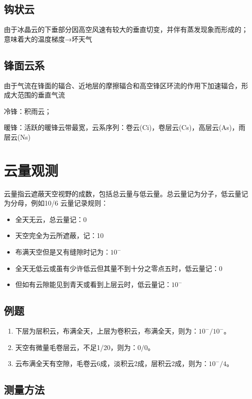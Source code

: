 \documentclass[UTF8,11pt]{ctexbook}
\begin{document}
\subsection{钩状云}

由于冰晶云的下垂部分因高空风速有较大的垂直切变，并伴有蒸发现象而形成的；意味着大的温度梯度→坏天气

\subsection{锋面云系}

由于气流在锋面的辐合、近地层的摩擦辐合和高空锋区环流的作用下加速辐合，形成大范围的垂直气流

冷锋：积雨云；

暖锋：活跃的暖锋云带最宽，云系序列：卷云(Ci)，卷层云(Cs)，高层云(As)，雨层云(Ns)


\section{云量观测}

云量指云遮蔽天空视野的成数，包括总云量与低云量。总云量记为分子，低云量记为分母，例如10/6
云量记录规则：
\begin{itemize}
    \item 全天无云，总云量记：0
    \item 天空完全为云所遮蔽，记：10
    \item 布满天空但是又有缝隙时记为：\(10^-\)
    \item 全天无低云或虽有少许低云但其量不到十分之零点五时，低云量记：0
    \item 但如有云隙能见到青天或看到上层云时，低云量记：\(10^-\)
\end{itemize}

\subsection{例题}
\begin{enumerate}
    \item 下层为层积云，布满全天，上层为卷积云，布满全天，则为：\(10^-/10^-\)。
    \item 天空有微量毛卷层云，不足1/20，则为：\(0/0\)。
    \item 云布满全天有空隙，毛卷云6成，淡积云2成，层积云2成，则为：\(10^-/4\)。
\end{enumerate}

\subsection{测量方法}
\end{document}
